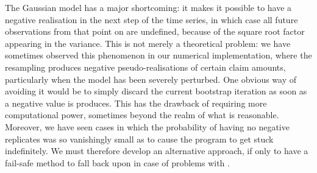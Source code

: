 \documentclass[a4paper]{book}
\begin{document}
The Gaussian model has a major shortcoming: it makes it possible to have a negative realisation in the next step of the time series, in which case all future observations from that point on are undefined, because of the square root factor appearing in the variance. This is not merely a theoretical problem: we have sometimes observed this phenomenon in our numerical implementation, where the resampling produces negative pseudo-realisations of certain claim amounts, particularly when the model has been severely perturbed. One obvious way of avoiding it would be to simply discard the current bootstrap iteration as soon as a negative value is produces. This has the drawback of requiring more computational power, sometimes beyond the realm of what is reasonable. Moreover, we have seen cases in which the probability of having no negative replicates was so vanishingly small as to cause the program to get stuck indefinitely. We must therefore develop an alternative approach, if only to have a fail-safe method to fall back upon in case of problems with .
\end{document}
